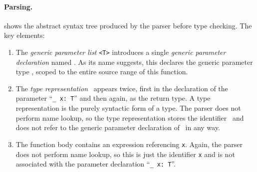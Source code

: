 \documentclass[../generics]{subfiles}
\begin{document}
\paragraph{Parsing.}  shows the abstract syntax tree produced by the parser before type checking. The key elements:
\begin{enumerate}
\item The \emph{generic parameter list} \texttt{<T>} introduces a single \emph{generic parameter declaration} named \tT. As its name suggests, this declares the generic parameter type \tT, scoped to the entire source range of this function.
\item The \emph{type representation} \tT\ appears twice, first in the declaration of the parameter ``\verb|_ x: T|'' and then again, as the return type. A type representation is the purely syntactic form of a type. The parser does not perform name lookup, so the type representation stores the identifier \tT\ and does not refer to the generic parameter declaration of \tT\ in any way.
\item The function body contains an expression referencing \texttt{x}. Again, the parser does not perform name lookup, so this is just the identifier \texttt{x} and is not associated with the parameter declaration ``\verb|_ x: T|''.
\end{enumerate}

\end{document}
